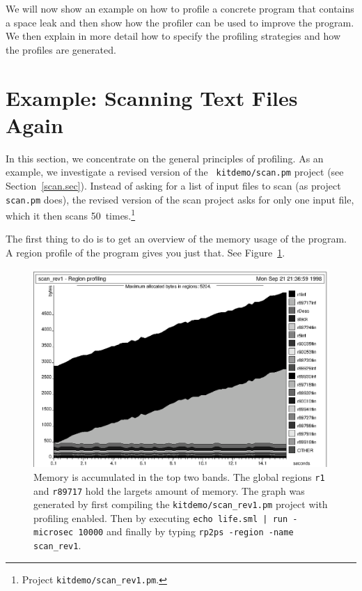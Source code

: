 \documentclass[12pt]{book}
\begin{document}
We will now show an example on how to profile a concrete program that
contains a space leak and then show how the profiler can be used to
improve the program. We then explain in more detail how to specify the
profiling strategies and how the profiles are generated.

\section{Example: Scanning Text Files Again}

In this section, we concentrate on the general principles of
profiling. As an example, we investigate a revised version of the {\tt
  kitdemo/scan.pm} project (see Section~\ref{scan.sec}). Instead of
asking for a list of input files to scan (as project \texttt{scan.pm}
does), the revised version of the scan project asks for only one input
file, which it then scans
%
50~times.\footnote{Project {\tt kitdemo/scan\_rev1.pm}.}

The first thing to do is to get an overview of the memory usage of the
program. A region profile of the program gives you just that. See
Figure~\ref{scan_rev1_1.fig}.
\begin{figure}
\begin{center}
  \includegraphics{scan_rev1_1.ps}
\end{center}
\caption{Memory is accumulated in the top two
  bands. The global regions \texttt{r1} and \texttt{r89717} hold the
  largets amount of memory. The graph was generated by first
  compiling the {\tt kitdemo/scan\_rev1.pm} project with profiling
  enabled. Then by executing \texttt{echo life.sml | run -microsec 10000} and finally by
  typing \texttt{rp2ps -region -name scan\_rev1}.}
\label{scan_rev1_1.fig}
\end{figure}
\end{document}
